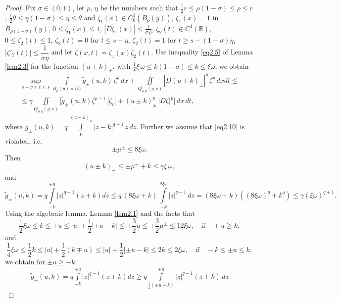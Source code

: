 \documentclass[a4paper,11pt,fullpage]{article}
\numberwithin{equation}{section}
\begin{document}
\begin{proof}
Fix $\sigma \in (0, 1)$, let $\rho$, $\eta$ be the numbers such that $\frac{1}{2} r\leqslant \rho(1-\sigma)\leqslant \rho \leqslant r$,
$\frac{1}{2}\theta\leqslant \eta(1-\sigma) \leqslant \eta \leqslant \theta$ and $\zeta_1(x)\in C^1_0(B_\rho(y))$, $\zeta_1(x)=1$ in $B_{\rho(1-\sigma)}(y)$, $0\leqslant \zeta_1(x)\leqslant 1$, $|D \zeta_1(x)|\leqslant \frac{1}{\sigma\,\rho}$, $\zeta_2(t)\in C^1(\mathbb{R})$,
$0\leqslant \zeta_2(t)\leqslant 1$, $\zeta_2(t)=0$ for $t\leqslant s-\eta$, $\zeta_2(t)=1$ for $t\geqslant s-(1-\sigma)\eta$, $|\zeta'_2(t)|
\leqslant \dfrac{1}{\sigma\eta}$ and let $\zeta(x, t)=\zeta_1(x) \zeta_2(t)$. Use inequality \eqref{eq2.5} of Lemma \ref{lem2.3} for the function $(u\pm k)_{\pm}$, with
$\frac{1}{2}\xi\,\omega\leqslant k(1-\sigma)\leqslant k\leqslant  \xi\omega$, we obtain
\begin{multline*}
\sup\limits_{s-\eta\leqslant t\leqslant s}\int\limits_{B_\rho(y)\times\{t\}}\tilde{g}_{\pm}(u, k)\,\zeta^p\,dx+
\iint\limits_{Q_{\rho,\eta}(y, s)}|D(u\pm k)_{\pm}|^p\,\zeta^p\,dx dt\leqslant\\\leqslant \gamma\iint\limits_{Q_{\rho, \eta}(y, s)}\Big[\tilde{g}_{\pm}(u, k)\zeta^{p-1}\,|\zeta_t|+(u\pm k)_{\pm}^p\,|D \zeta|^p\Big]\,dx\,dt,
\end{multline*}
where $\tilde{g}_{\pm}(u, k)=q\,\int\limits^{(u\pm k)_{\pm}}_0 |z - k|^{q-1}\,z\,dz$.  Further we assume that \eqref{eq2.10} is violated, i.e. $$\pm\mu^{\pm}\leqslant 8 \xi \omega.$$
Then 
$$(u\pm k)_{\pm}\leqslant \pm \mu^{\pm}+k\leqslant \gamma \xi\,\omega,$$
and
\begin{equation*}
\tilde{g}_{\pm}(u, k)=q\int\limits^{\pm u}_{-k}|z|^{q-1}(z+k) dz \leqslant q\,(8\xi \omega + k)\,\int\limits^{8\xi \omega}_{- k}|z|^{q-1}\,dz=(8\xi \omega + k)((8 \xi\omega)^q + k^q)\leqslant \gamma (\xi \omega)^{q+1}.
\end{equation*}
Using the algebraic lemma, Lemma \ref{lem2.1} and the facts that
$$\frac{1}{2}\xi\omega \leqslant k\leqslant \pm u\leqslant |u|+\frac{1}{2}|\pm u-k|\leqslant \pm \frac{3}{2} u\leqslant \pm  \frac{3}{2} \mu^{\pm}\leqslant 12 \xi\omega, \quad\text{if}\quad \pm u\geqslant k,$$
and
$$\frac{1}{4} \xi \omega \leqslant \frac{1}{2} k\leqslant |u|+\frac{1}{2}(k\mp u)\leqslant |u|+\frac{1}{2}|\pm u-k|\leqslant 2 k\leqslant 2 \xi \omega,\quad \text{if} \quad -k\leqslant \pm u\leqslant k,$$
we obtain  for $\pm u \geqslant -k$
\begin{multline*}
\tilde{g}_{\pm}(u, k)=q\int\limits^{\pm u}_{-k}|z|^{q-1}(z+k) dz\geqslant q\int\limits^{\pm u}_{\frac{1}{2}(\pm u-k)}|z|^{q-1}(z+k)\,dz

\end{multline*}
\end{proof}
\end{document}
